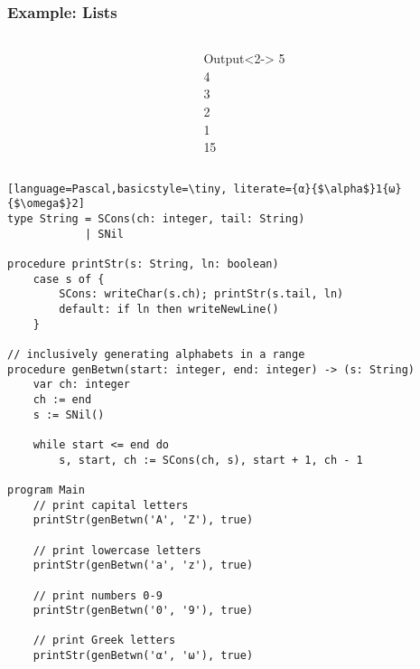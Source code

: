 \documentclass{beamer}
\begin{document}
\begin{frame}
\frametitle{Example: Lists}
    \begin{columns}[T,onlytextwidth]
        \begin{column}{.8\textwidth}
            \begin{minipage}{\textwidth}
                \usebox{\exampleList}
            \end{minipage}
        \end{column}
        \begin{column}{.2\textwidth}
            \begin{onlyenv}
                \begin{minipage}{\textwidth}
                    \begin{block}{Output}<2->
                        5\\
                        4\\
                        3\\
                        2\\
                        1\\
                        15
                    \end{block}
                \end{minipage}
            \end{onlyenv}
        \end{column}
    \end{columns}
\end{frame}


\begin{lrbox}{\exampleString}
\begin{lstlisting}[language=Pascal,basicstyle=\tiny, literate={α}{$\alpha$}1{ω}{$\omega$}2]
type String = SCons(ch: integer, tail: String)
            | SNil

procedure printStr(s: String, ln: boolean)
    case s of {
        SCons: writeChar(s.ch); printStr(s.tail, ln)
        default: if ln then writeNewLine()
    }

// inclusively generating alphabets in a range
procedure genBetwn(start: integer, end: integer) -> (s: String)
    var ch: integer
    ch := end
    s := SNil()
    
    while start <= end do
        s, start, ch := SCons(ch, s), start + 1, ch - 1

program Main
    // print capital letters
    printStr(genBetwn('A', 'Z'), true)
    
    // print lowercase letters
    printStr(genBetwn('a', 'z'), true)
    
    // print numbers 0-9
    printStr(genBetwn('0', '9'), true)
    
    // print Greek letters
    printStr(genBetwn('α', 'ω'), true)

\end{lstlisting}
\end{lrbox}
\end{document}
